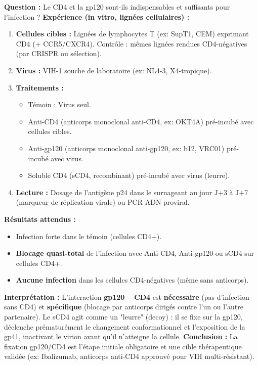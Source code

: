 \documentclass[11pt]{article}
\begin{document}
\begin{experience}
\textbf{Question :} Le CD4 et la gp120 sont-ils indispensables et suffisants pour l'infection ?
\textbf{Expérience (in vitro, lignées cellulaires) :}
\begin{enumerate}
    \item \textbf{Cellules cibles :} Lignées de lymphocytes T (ex: SupT1, CEM) exprimant CD4 (+ CCR5/CXCR4). Contrôle : mêmes lignées rendues CD4-négatives (par CRISPR ou sélection).
    \item \textbf{Virus :} VIH-1 souche de laboratoire (ex: NL4-3, X4-tropique).
    \item \textbf{Traitements :}
    \begin{itemize}
        \item Témoin : Virus seul.
        \item Anti-CD4 (anticorps monoclonal anti-CD4, ex: OKT4A) pré-incubé avec cellules cibles.
        \item Anti-gp120 (anticorps monoclonal anti-gp120, ex: b12, VRC01) pré-incubé avec virus.
        \item Soluble CD4 (sCD4, recombinant) pré-incubé avec virus (leurre).
    \end{itemize}
    \item \textbf{Lecture :} Dosage de l'antigène p24 dans le surnageant au jour J+3 à J+7 (marqueur de réplication virale) ou PCR ADN proviral.
\end{enumerate}
\textbf{Résultats attendus :}
\begin{itemize}
    \item Infection forte dans le témoin (cellules CD4+).
    \item \textbf{Blocage quasi-total} de l'infection avec Anti-CD4, Anti-gp120 ou sCD4 sur cellules CD4+.
    \item \textbf{Aucune infection} dans les cellules CD4-négatives (même sans anticorps).
\end{itemize}
\textbf{Interprétation :} L'interaction \textbf{gp120 -- CD4} est \textbf{nécessaire} (pas d'infection sans CD4) et \textbf{spécifique} (blocage par anticorps dirigés contre l'un ou l'autre partenaire). Le sCD4 agit comme un "leurre" (decoy) : il se fixe sur la gp120, déclenche prématurément le changement conformationnel et l'exposition de la gp41, inactivant le virion avant qu'il n'atteigne la cellule.
\textbf{Conclusion :} La fixation gp120/CD4 est l'étape initiale obligatoire et une cible thérapeutique validée (ex: Ibalizumab, anticorps anti-CD4 approuvé pour VIH multi-résistant).
\end{experience}
\end{document}
